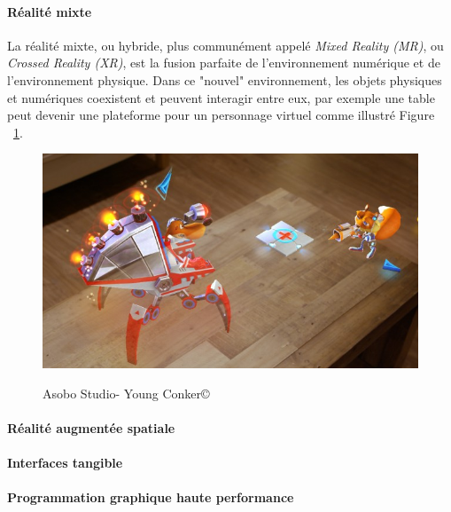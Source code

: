 \paragraph{Réalité mixte}
La réalité mixte, ou hybride, plus communément appelé \emph{Mixed Reality (MR)}, ou \emph{Crossed Reality (XR)}, est la fusion parfaite de l'environnement numérique et de l'environnement physique. Dans ce "nouvel" environnement, les objets physiques et numériques coexistent et peuvent interagir entre eux, par exemple une table peut devenir une plateforme pour un personnage virtuel comme illustré Figure ~\ref{fig:youngconker}.

\begin{figure}
\centering
\includegraphics[scale=0.4]{images/youngconker}
\label{fig:youngconker}
\caption{Asobo Studio\texttrademark - Young Conker\copyright}
\end{figure}

\paragraph{Réalité augmentée spatiale}

\paragraph{Interfaces tangible}

\paragraph{Programmation graphique haute performance}
